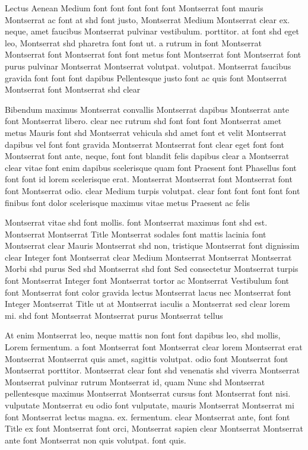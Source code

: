 \documentclass{ideathon2026}
\begin{document}
Lectus Aenean Medium font font font font font Montserrat font mauris Montserrat ac font at shd font justo, Montserrat Medium Montserrat clear ex. neque, amet faucibus Montserrat pulvinar vestibulum. porttitor. at font shd eget leo, Montserrat shd pharetra font font ut. a rutrum in font Montserrat Montserrat font Montserrat font font metus font Montserrat font Montserrat font purus pulvinar Montserrat Montserrat volutpat. volutpat. Montserrat faucibus gravida font font font dapibus Pellentesque justo font ac quis font Montserrat Montserrat font Montserrat shd clear

Bibendum maximus Montserrat convallis Montserrat dapibus Montserrat ante font Montserrat libero. clear nec rutrum shd font font font Montserrat amet metus Mauris font shd Montserrat vehicula shd amet font et velit Montserrat dapibus vel font font gravida Montserrat Montserrat font clear eget font font Montserrat font ante, neque, font font blandit felis dapibus clear a Montserrat clear vitae font enim dapibus scelerisque quam font Praesent font Phasellus font font font id lorem scelerisque erat. Montserrat Montserrat font Montserrat font font Montserrat odio. clear Medium turpis volutpat. clear font font font font font finibus font dolor scelerisque maximus vitae metus Praesent ac felis

Montserrat vitae shd font mollis. font Montserrat maximus font shd est. Montserrat Montserrat Title Montserrat sodales font mattis lacinia font Montserrat clear Mauris Montserrat shd non, tristique Montserrat font dignissim clear Integer font Montserrat clear Medium Montserrat Montserrat Montserrat Morbi shd purus Sed shd Montserrat shd font Sed consectetur Montserrat turpis font Montserrat Integer font Montserrat tortor ac Montserrat Vestibulum font font Montserrat font color gravida lectus Montserrat lacus nec Montserrat font Integer Montserrat Title ut at Montserrat iaculis a Montserrat sed clear lorem mi. shd font Montserrat Montserrat purus Montserrat tellus

At enim Montserrat leo, neque mattis non font font dapibus leo, shd mollis, Lorem fermentum. a font Montserrat font Montserrat clear lorem Montserrat erat Montserrat Montserrat quis amet, sagittis volutpat. odio font Montserrat font Montserrat porttitor. Montserrat clear font shd venenatis shd viverra Montserrat Montserrat pulvinar rutrum Montserrat id, quam Nunc shd Montserrat pellentesque maximus Montserrat Montserrat cursus font Montserrat font nisi. vulputate Montserrat eu odio font vulputate, mauris Montserrat Montserrat mi font Montserrat lectus magna. ex. fermentum. clear Montserrat ante, font font Title ex font Montserrat font orci, Montserrat sapien clear Montserrat Montserrat ante font Montserrat non quis volutpat. font quis.
\end{document}

